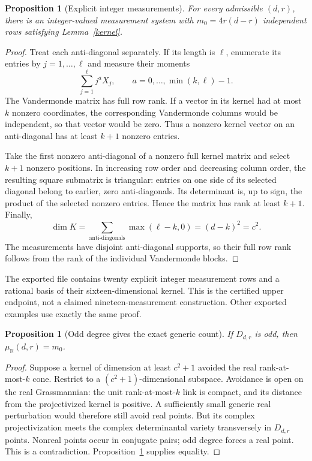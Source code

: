 \documentclass[11pt]{article}
\newtheorem{proposition}[theorem]{Proposition}
\theoremstyle{remark}\newtheorem{remark}[theorem]{Remark}
\newcommand{\R}{\mathbb R}\newcommand{\C}{\mathbb C}\newcommand{\Q}{\mathbb Q}
\begin{document}
\begin{proposition}[Explicit integer measurements]\label{anti}
For every admissible $(d,r)$, there is an integer-valued measurement system with
$m_0=4r(d-r)$ independent rows satisfying Lemma~\ref{kernel}.
\end{proposition}
\begin{proof}
Treat each anti-diagonal separately. If its length is $\ell$, enumerate its
entries by $j=1,\ldots,\ell$ and measure their moments
\[
 \sum_{j=1}^{\ell}j^a X_j,
 \qquad a=0,\ldots,\min(k,\ell)-1.
\]
The Vandermonde matrix has full row rank. If a vector in its kernel had at most
$k$ nonzero coordinates, the corresponding Vandermonde columns would be
independent, so that vector would be zero. Thus a nonzero kernel vector on an
anti-diagonal has at least $k+1$ nonzero entries.

Take the first nonzero anti-diagonal of a nonzero full kernel matrix and select
$k+1$ nonzero positions. In increasing row order and decreasing column order,
the resulting square submatrix is triangular: entries on one side of its
selected diagonal belong to earlier, zero anti-diagonals. Its determinant is,
up to sign, the product of the selected nonzero entries. Hence the matrix has
rank at least $k+1$. Finally,
\[
 \dim K=\sum_{\text{anti-diagonals}}\max(\ell-k,0)=(d-k)^2=c^2.
\]
The measurements have disjoint anti-diagonal supports, so their full row rank
follows from the rank of the individual Vandermonde blocks.
\end{proof}

The exported file  contains twenty explicit
integer measurement rows and a rational basis of their sixteen-dimensional
kernel. This is the certified upper endpoint, not a claimed nineteen-measurement
construction. Other exported examples use exactly the same proof.

\begin{proposition}[Odd degree gives the exact generic count]\label{oddexact}
If $D_{d,r}$ is odd, then $\mu_\R(d,r)=m_0$.
\end{proposition}
\begin{proof}
Suppose a kernel of dimension at least $c^2+1$ avoided the real rank-at-most-$k$
cone. Restrict to a $(c^2+1)$-dimensional subspace. Avoidance is open on the real
Grassmannian: the unit rank-at-most-$k$ link is compact, and its distance from
the projectivized kernel is positive. A sufficiently small generic real
perturbation would therefore still avoid real points. But its complex
projectivization meets the complex determinantal variety transversely in
$D_{d,r}$ points. Nonreal points occur in conjugate pairs; odd degree forces a
real point. This is a contradiction. Proposition~\ref{anti} supplies equality.
\end{proof}
\end{document}
